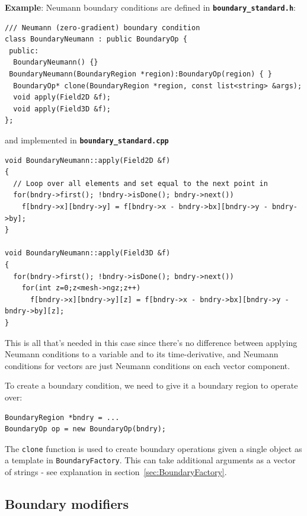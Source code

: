 \documentclass[12pt]{article}
\newcommand{\code}[1]{\texttt{#1}}
\newcommand{\file}[1]{\texttt{\bf #1}}
\begin{document}
{\bf Example}: Neumann boundary conditions are defined in
\file{boundary\_standard.h}:
\begin{lstlisting}[firstnumber=22]
/// Neumann (zero-gradient) boundary condition
class BoundaryNeumann : public BoundaryOp {
 public:
  BoundaryNeumann() {}
 BoundaryNeumann(BoundaryRegion *region):BoundaryOp(region) { }
  BoundaryOp* clone(BoundaryRegion *region, const list<string> &args);
  void apply(Field2D &f);
  void apply(Field3D &f);
};
\end{lstlisting}
and implemented in \file{boundary\_standard.cpp} 
\begin{lstlisting}[firstnumber=52]
void BoundaryNeumann::apply(Field2D &f)
{
  // Loop over all elements and set equal to the next point in
  for(bndry->first(); !bndry->isDone(); bndry->next())
    f[bndry->x][bndry->y] = f[bndry->x - bndry->bx][bndry->y - bndry->by];
}

void BoundaryNeumann::apply(Field3D &f)
{
  for(bndry->first(); !bndry->isDone(); bndry->next())
    for(int z=0;z<mesh->ngz;z++)
      f[bndry->x][bndry->y][z] = f[bndry->x - bndry->bx][bndry->y - bndry->by][z];
}
\end{lstlisting}
This is all that's needed in this case since there's no difference between
applying Neumann conditions to a variable and to its time-derivative, 
and Neumann conditions for vectors are just Neumann conditions
on each vector component. 

To create a boundary condition, we need to give it a boundary region
to operate over:
\begin{lstlisting}[numbers=none]
BoundaryRegion *bndry = ...
BoundaryOp op = new BoundaryOp(bndry);
\end{lstlisting}

The \code{clone} function is used to create
boundary operations given a single object as a template
in \code{BoundaryFactory}. This can take additional arguments
as a vector of strings - see explanation in section~\ref{sec:BoundaryFactory}.

\subsection{Boundary modifiers}
\end{document}
